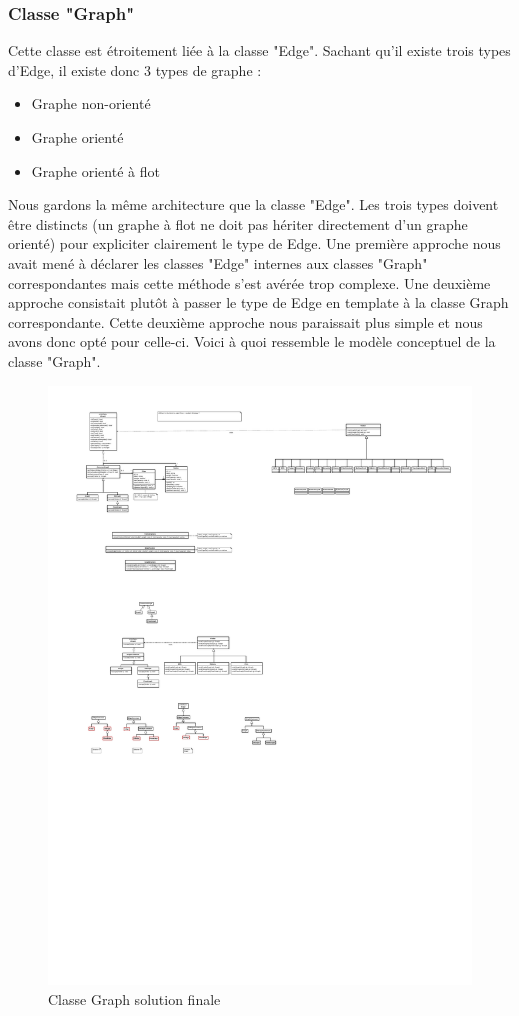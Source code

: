 \documentclass[french]{article}
\begin{document}
			\subsubsection{Classe "Graph"}
			Cette classe est étroitement liée à la classe "Edge". Sachant qu'il existe trois types d'Edge, il existe donc 3 types de graphe :
			\begin{itemize}
				\item Graphe non-orienté
				\item Graphe orienté
				\item Graphe orienté à flot
			\end{itemize}
			Nous gardons la même architecture que la classe "Edge". Les trois types doivent être distincts (un graphe à flot ne doit pas hériter directement d'un graphe orienté) pour expliciter clairement le type de Edge.
			Une première approche nous avait mené à déclarer les classes "Edge" internes aux classes "Graph" correspondantes mais cette méthode s'est avérée trop complexe. Une deuxième approche consistait plutôt à passer le type de Edge en template à la classe Graph correspondante. Cette deuxième approche nous paraissait plus simple et nous avons donc opté pour celle-ci.
			Voici à quoi ressemble le modèle conceptuel de la classe "Graph".
			\begin{figure}[H]
				\centering
				\includegraphics[scale=4.0]{Conception/graph/classgraphsol1.pdf}
				\caption{Classe Graph solution finale}
			\end{figure}
\end{document}
